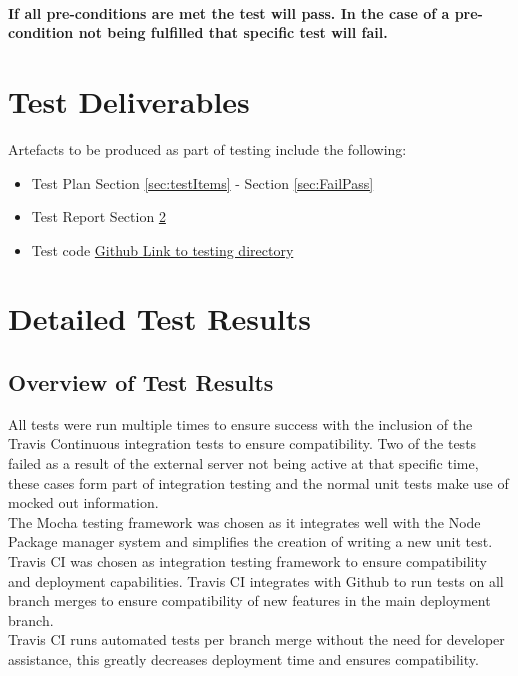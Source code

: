 \documentclass{article}
\begin{document}
\paragraph{If all pre-conditions are met the test will pass. In the case of a pre-condition not being fulfilled that specific test will fail.}


\section{Test Deliverables}
Artefacts to be produced as part of testing include the following:
\begin{itemize}
\item Test Plan Section \ref{sec:testItems} - Section \ref{sec:FailPass}
\item Test Report Section \ref{sec:testReport}
\item Test code \href{https://github.com/QuintonWeenink/ValknutSolutions/tree/develop/test}{Github Link to testing directory}
\end{itemize}

\section{Detailed Test Results}\label{sec:testReport}
\subsection{Overview of Test Results}
All tests were run multiple times to ensure success with the inclusion of the Travis Continuous integration tests to ensure compatibility. Two of the tests failed as a result of the external server not being active at that specific time, these cases form part of integration testing and the normal unit tests make use of mocked out information.\\
The Mocha testing framework was chosen as it integrates well with the Node Package manager system and 
simplifies the creation of writing a new unit test.\\
Travis CI was chosen as integration testing framework to ensure compatibility and deployment capabilities. Travis CI integrates with Github to run tests on all branch merges to ensure compatibility of new features in the main deployment branch.\\
Travis CI runs automated tests per branch merge without the need for developer assistance, this greatly decreases deployment time and ensures compatibility.
\end{document}
